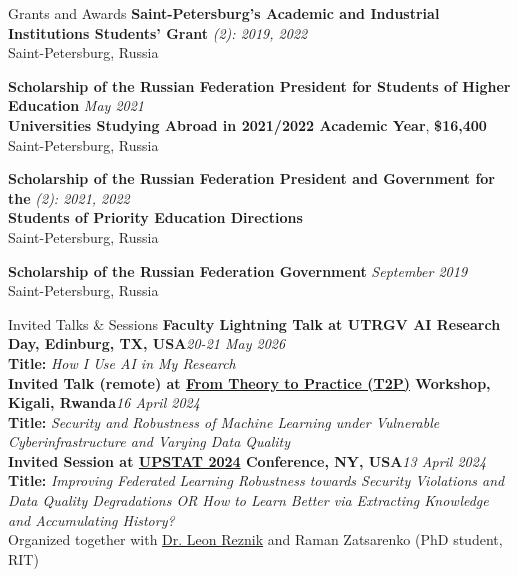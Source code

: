\documentclass[10pt]{resume} %
\begin{document}
\begin{rSection}{Grants and Awards}
\vspace{-1mm}
\textbf{Saint-Petersburg's Academic and Industrial Institutions Students' Grant} \hfill {\em (2): 2019, 2022} \\
Saint-Petersburg, Russia

\vspace{-1mm}
\textbf{Scholarship of the Russian Federation President for Students of Higher Education} \hfill {\em May 2021} \\ \textbf{Universities Studying Abroad in 2021/2022 Academic Year}, \textbf{\$16,400} \\
Saint-Petersburg, Russia

\vspace{-1mm}
\textbf{Scholarship of the Russian Federation President and Government for the} \hfill {\em (2): 2021, 2022} \\ \textbf{Students of Priority Education Directions} \\
Saint-Petersburg, Russia

\vspace{-1mm}
\textbf{Scholarship of the Russian Federation Government} \hfill {\em September 2019} \\
Saint-Petersburg, Russia
\end{rSection}


\begin{rSection}{Invited Talks \& Sessions}
    \textbf{Faculty Lightning Talk at UTRGV AI Research Day, Edinburg, TX, USA}\hfill\small{\em 20-21 May 2026}\normalsize\\
    \textbf{Title:} \textit{How I Use AI in My Research}\\

    \textbf{Invited Talk (remote) at \href{https://sites.google.com/view/t2p-workshop/home}{From Theory to Practice (T2P)} Workshop, Kigali, Rwanda}\hfill\small{\em 16 April 2024}\normalsize\\
    \textbf{Title:} \textit{Security and Robustness of Machine Learning under Vulnerable Cyberinfrastructure and Varying Data Quality}\\

    \textbf{Invited Session at \href{https://community.amstat.org/rochester/events/upstats-2024}{UPSTAT 2024} Conference, NY, USA}\hfill\small{\em 13 April 2024}\normalsize\\
    \textbf{Title:} \textit{Improving Federated Learning Robustness towards Security Violations and Data Quality Degradations OR How to Learn Better via Extracting Knowledge and Accumulating History?}\\
    Organized together with \href{https://www.rit.edu/directory/lrvcs-leon-reznik}{Dr. Leon Reznik} and Raman Zatsarenko (PhD student, RIT)
\end{rSection}
\end{document}
